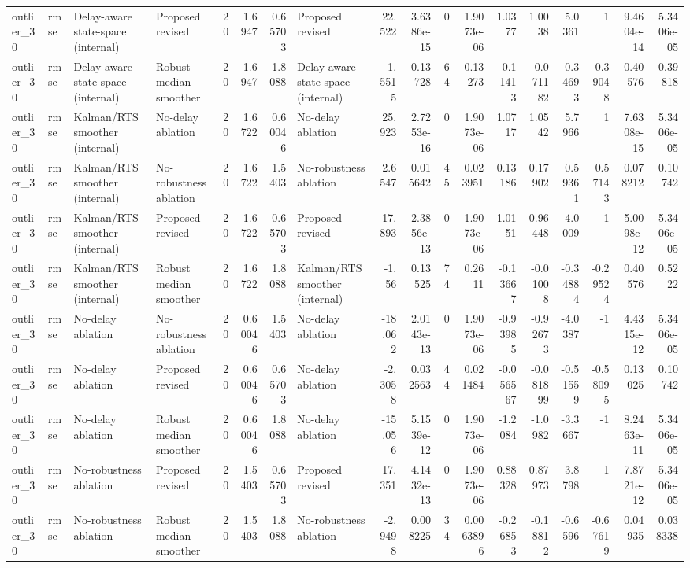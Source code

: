 \begin{table}[!htbp]
{\begin{tabular}{llllrrrlrrrrrrrrrr}
outlier_30 & rmse & Delay-aware state-space (internal) & Proposed revised & 20 & 1.6947 & 0.65703 & Proposed revised & 22.522 & 3.6386e-15 & 0 & 1.9073e-06 & 1.0377 & 1.0038 & 5.0361 & 1 & 9.4604e-14 & 5.3406e-05 \\
outlier_30 & rmse & Delay-aware state-space (internal) & Robust median smoother & 20 & 1.6947 & 1.8088 & Delay-aware state-space (internal) & -1.5515 & 0.13728 & 64 & 0.13273 & -0.11413 & -0.071182 & -0.34693 & -0.39048 & 0.40576 & 0.39818 \\
outlier_30 & rmse & Kalman/RTS smoother (internal) & No-delay ablation & 20 & 1.6722 & 0.60046 & No-delay ablation & 25.923 & 2.7253e-16 & 0 & 1.9073e-06 & 1.0717 & 1.0542 & 5.7966 & 1 & 7.6308e-15 & 5.3406e-05 \\
outlier_30 & rmse & Kalman/RTS smoother (internal) & No-robustness ablation & 20 & 1.6722 & 1.5403 & No-robustness ablation & 2.6547 & 0.015642 & 45 & 0.023951 & 0.13186 & 0.17902 & 0.59361 & 0.57143 & 0.078212 & 0.10742 \\
outlier_30 & rmse & Kalman/RTS smoother (internal) & Proposed revised & 20 & 1.6722 & 0.65703 & Proposed revised & 17.893 & 2.3856e-13 & 0 & 1.9073e-06 & 1.0151 & 0.96448 & 4.0009 & 1 & 5.0098e-12 & 5.3406e-05 \\
outlier_30 & rmse & Kalman/RTS smoother (internal) & Robust median smoother & 20 & 1.6722 & 1.8088 & Kalman/RTS smoother (internal) & -1.56 & 0.13525 & 74 & 0.2611 & -0.13667 & -0.01008 & -0.34884 & -0.29524 & 0.40576 & 0.5222 \\
outlier_30 & rmse & No-delay ablation & No-robustness ablation & 20 & 0.60046 & 1.5403 & No-delay ablation & -18.062 & 2.0143e-13 & 0 & 1.9073e-06 & -0.93985 & -0.92673 & -4.0387 & -1 & 4.4315e-12 & 5.3406e-05 \\
outlier_30 & rmse & No-delay ablation & Proposed revised & 20 & 0.60046 & 0.65703 & No-delay ablation & -2.3058 & 0.032563 & 44 & 0.021484 & -0.056567 & -0.081899 & -0.51559 & -0.58095 & 0.13025 & 0.10742 \\
outlier_30 & rmse & No-delay ablation & Robust median smoother & 20 & 0.60046 & 1.8088 & No-delay ablation & -15.056 & 5.1539e-12 & 0 & 1.9073e-06 & -1.2084 & -1.0982 & -3.3667 & -1 & 8.2463e-11 & 5.3406e-05 \\
outlier_30 & rmse & No-robustness ablation & Proposed revised & 20 & 1.5403 & 0.65703 & Proposed revised & 17.351 & 4.1432e-13 & 0 & 1.9073e-06 & 0.88328 & 0.87973 & 3.8798 & 1 & 7.8721e-12 & 5.3406e-05 \\
outlier_30 & rmse & No-robustness ablation & Robust median smoother & 20 & 1.5403 & 1.8088 & No-robustness ablation & -2.9498 & 0.008225 & 34 & 0.0063896 & -0.26853 & -0.18812 & -0.6596 & -0.67619 & 0.04935 & 0.038338 \\

\end{tabular}}
\end{table}
